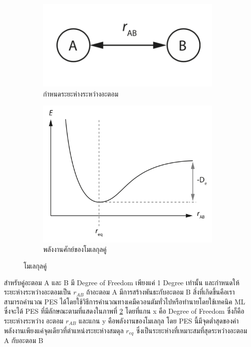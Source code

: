 \begin{figure}[htbp]
    \centering
    \begin{subfigure}{0.5\textwidth}
        \centering
        \includegraphics[width=0.9\linewidth]{fig/diatomic_molecule.png}
        \caption{กำหนดระยะห่างระหว่างอะตอม}
        \label{fig:diatomic_mol}
    \end{subfigure}%
    \begin{subfigure}{0.5\textwidth}
        \centering
        \includegraphics[width=0.9\linewidth]{fig/PES_diatomic_mol.png}
        \caption{พลังงานศักย์ของโมเลกุลคู่}
        \label{fig:PES_diatomic}
    \end{subfigure}
    \caption{โมเลกุลคู่}
    \label{fig:diatomic_mol_and_PES}
\end{figure}

สำหรับคู่อะตอม A และ B มี Degree of Freedom เพียงแค่ 1 Degree เท่านั้น และกำหนดให้ระยะห่างระหว่างอะตอมเป็น $r_{AB}$ ถ้าอะตอม 
A มีการสร้างพันธะกับอะตอม B สิ่งที่เกิดขึ้นคือเราสามารถคำนวณ PES ได้โดยใช้วิธีการคำนวณทางเคมีควอนตัมทั่วไปหรือทำนายโดยใช้เทคนิค ML 
ซึ่งจะได้ PES ที่มีลักษณะตามที่แสดงในภาพที่ \ref{fig:PES_diatomic} โดยที่แกน x คือ Degree of Freedom ซึ่งก็คือระยะห่างระหว่าง%
อะตอม $r_{AB}$ และแกน y คือพลังงานของโมเลกุล โดย PES นี้มีจุดต่ำสุดของค่าพลังงานเพียงแค่จุดเดียวที่ตำแหน่งระยะห่างสมดุล $r_{eq}$ 
ซึ่งเป็นระยะห่างที่เหมาะสมที่สุดระหว่างอะตอม A กับอะตอม B

